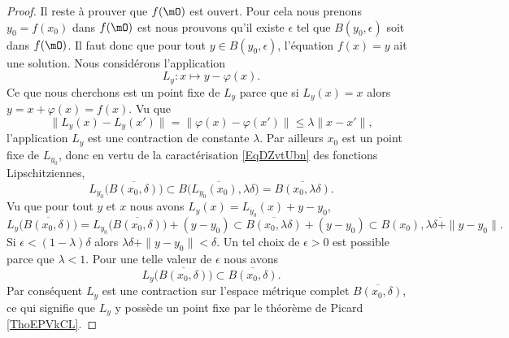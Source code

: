 \begin{proof}
    Il reste à prouver que \( f(\mO)\) est ouvert. Pour cela nous prenons \( y_0=f(x_0)\) dans \( f(\mO)\) est nous prouvons qu'il existe \( \epsilon\) tel que \( B(y_0,\epsilon)\) soit dans \( f(\mO)\). Il faut donc que pour tout \( y\in B(y_0,\epsilon)\), l'équation \( f(x)=y\) ait une solution. Nous considérons l'application
    \begin{equation}
        L_y\colon x\mapsto y-\varphi(x).
    \end{equation}
    Ce que nous cherchons est un point fixe de \( L_y\) parce que si \( L_y(x)=x\) alors \( y=x+\varphi(x)=f(x)\). Vu que
    \begin{equation}
        \big\| L_y(x)-L_y(x') \big\|=\big\| \varphi(x)-\varphi(x') \big\|\leq\lambda\| x-x' \|,
    \end{equation}
    l'application \( L_y\) est une contraction de constante \( \lambda\). Par ailleurs \( x_0\) est un point fixe de \( L_{y_0}\), donc en vertu de la caractérisation \eqref{EqDZvtUbn} des fonctions Lipschitziennes, 
    \begin{equation}
        L_{y_0}\big( \overline{ B(x_0,\delta) } \big)\subset \overline{ B\big( L_{y_0}(x_0),\lambda\delta \big) }=\overline{ B(x_0,\lambda\delta) }.
    \end{equation}
    Vu que pour tout \( y\) et \( x\) nous avons \( L_y(x)=L_{y_0}(x)+y-y_0\),
    \begin{equation}
    L_y\big( \overline{ B(x_0,\delta) } \big)=L_{y_0}\big( \overline{ B(x_0,\delta) } \big)+(y-y_0)\subset \overline{ B(x_0,\lambda\delta) }+(y-y_0)\subset \overline{ B(x_0),\lambda\delta+\| y-y_0 \| }.
    \end{equation}
    Si \( \epsilon<(1-\lambda)\delta\) alors \( \lambda\delta+\| y-y_0 \|<\delta\). Un tel choix de \( \epsilon>0\) est possible parce que \( \lambda<1\). Pour une telle valeur de \( \epsilon\) nous avons
    \begin{equation}
        L_y\big( \overline{ B(x_0,\delta) } \big)\subset \overline{ B(x_0,\delta) }.
    \end{equation}
    Par conséquent \( L_y\) est une contraction sur l'espace métrique complet \( \overline{ B(x_0,\delta) }\), ce qui signifie que \( L_y\) y possède un point fixe par le théorème de Picard \ref{ThoEPVkCL}.
\end{proof}

